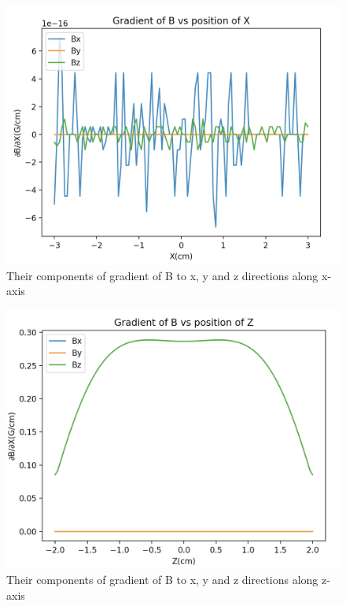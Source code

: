 \documentclass{article}
\begin{document}
\begin{figure}[h]
	\centering
	\includegraphics[scale=0.45]{MOTGradx}
	\caption{Their components of gradient of B to x, y and z directions along x-axis}
\end{figure}

\begin{figure}[h]
	\centering
	\includegraphics[scale=0.45]{MOTGradz}
	\caption{Their components of gradient of B to x, y and z directions along z-axis}
\end{figure}
\end{document}
